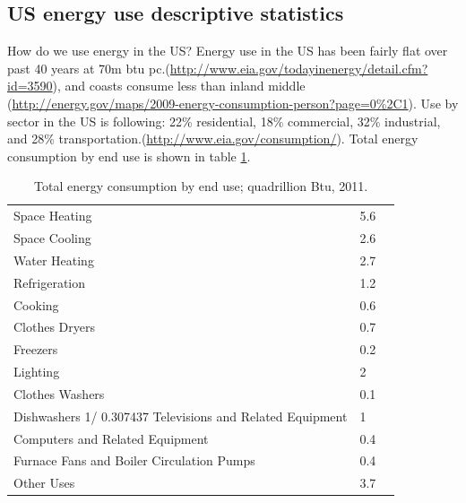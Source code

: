 \documentclass[10pt, letterpaper]{article}
\begin{document}
\begin{spacing}{1.5}
\section{US energy use descriptive statistics}
How do we use energy in the US? %
Energy use in the US has been fairly flat over past 40 years at 70m btu
pc.(\url{http://www.eia.gov/todayinenergy/detail.cfm?id=3590}), and coasts consume
less than inland middle
(\url{http://energy.gov/maps/2009-energy-consumption-person?page=0%2C1}). 
Use by sector in the US is following: 22\% residential, 18\% commercial, 32\% industrial, and
28\% transportation.(\url{http://www.eia.gov/consumption/}). 
 Total energy consumption by end use is shown in table \ref{tot-ene}.





\begin{table}[H]\centering\footnotesize
\caption{\label{tot-ene} Total energy consumption by end use; quadrillion
  Btu, 2011.}
\begin{tabular}{lll}   \hline 
Space Heating&	5.6\\
Space Cooling&	2.6\\
Water Heating&	2.7\\
Refrigeration&	1.2\\
Cooking&	0.6\\
Clothes Dryers&	0.7\\
Freezers&	0.2\\
Lighting&	2\\
Clothes Washers&	0.1\\
Dishwashers 1/	0.307437
Televisions and Related Equipment&	1\\
Computers and Related Equipment &	0.4\\
Furnace Fans and Boiler Circulation Pumps&	0.4\\
Other Uses&	3.7\\\hline
\end{tabular}\end{table}


\end{spacing}
\end{document}
